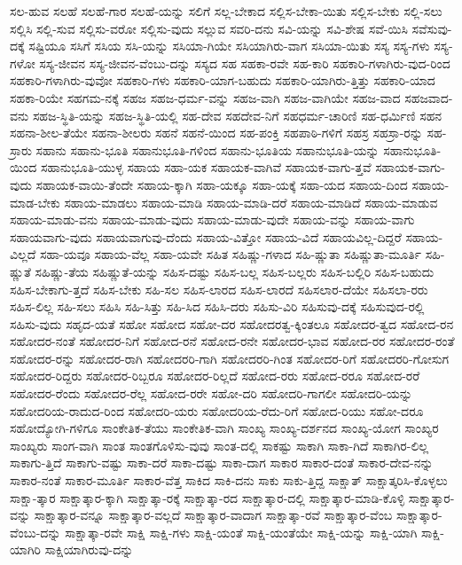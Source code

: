 {ಸಲ-ಹುವ
ಸಲಹೆ
ಸಲಹೆ-ಗಾರ
ಸಲಹೆ-ಯನ್ನು
ಸಲಿಗೆ
ಸಲ್ಲ-ಬೇಕಾದ
ಸಲ್ಲಿಸ-ಬೇಕಾ-ಯಿತು
ಸಲ್ಲಿಸ-ಬೇಕು
ಸಲ್ಲಿ-ಸಲು
ಸಲ್ಲಿಸಿ
ಸಲ್ಲಿ-ಸುವ
ಸಲ್ಲಿಸು-ವರೋ
ಸಲ್ಲಿಸು-ವುದು
ಸಲ್ಲುವ
ಸವರಿ-ದನು
ಸವಿ-ಯನ್ನು
ಸವಿ-ಶೇಷ
ಸವೆ-ಯಿಸಿ
ಸವೆಸುವು-ದಕ್ಕೆ
ಸಷ್ಟಿಯೂ
ಸಸಿಗೆ
ಸಸಿಯ
ಸಸಿ-ಯನ್ನು
ಸಸಿಯಾ-ಗಿಯೇ
ಸಸಿಯಾಗಿರು-ವಾಗ
ಸಸಿಯಾ-ಯಿತು
ಸಸ್ಯ
ಸಸ್ಯ-ಗಳು
ಸಸ್ಯ-ಗಳೋ
ಸಸ್ಯ-ಜೀವನ
ಸಸ್ಯ-ಜೀವನ-ವೆಂಬು-ದನ್ನು
ಸಸ್ಯದ
ಸಹ
ಸಹಕಾ-ರವೇ
ಸಹ-ಕಾರಿ
ಸಹಕಾರಿ-ಗಳಾಗಿರು-ವುದ-ರಿಂದ
ಸಹಕಾರಿ-ಗಳಾಗಿರು-ವುವೋ
ಸಹಕಾರಿ-ಗಳು
ಸಹಕಾರಿ-ಯಾಗ-ಬಹುದು
ಸಹಕಾರಿ-ಯಾಗಿರು-ತ್ತಿತ್ತು
ಸಹಕಾರಿ-ಯಾದ
ಸಹಕಾ-ರಿಯೇ
ಸಹಗಮ-ನಕ್ಕೆ
ಸಹಜ
ಸಹಜ-ಧರ್ಮ-ವನ್ನು
ಸಹಜ-ವಾಗಿ
ಸಹಜ-ವಾಗಿಯೇ
ಸಹಜ-ವಾದ
ಸಹಜವಾದ-ವನು
ಸಹಜ-ಸ್ಥಿತಿ-ಯನ್ನು
ಸಹಜ-ಸ್ಥಿತಿ-ಯಲ್ಲಿ
ಸಹ-ದೇವ
ಸಹದೇವ-ನಿಗೆ
ಸಹಧರ್ಮ-ಚಾರಿಣಿ
ಸಹ-ಧರ್ಮಿಣಿ
ಸಹನ
ಸಹನಾ-ಶೀಲ-ತೆಯೇ
ಸಹನಾ-ಶೀಲರು
ಸಹನೆ
ಸಹನೆ-ಯಿಂದ
ಸಹ-ಪಂಕ್ತಿ
ಸಹಪಾಠಿ-ಗಳಿಗೆ
ಸಹಸ್ರ
ಸಹಸ್ರಾ-ರನ್ನು
ಸಹ-ಸ್ರಾರು
ಸಹಾನು
ಸಹಾನು-ಭೂತಿ
ಸಹಾನುಭೂತಿ-ಗಳಿಂದ
ಸಹಾನು-ಭೂತಿಯ
ಸಹಾನುಭೂತಿ-ಯನ್ನು
ಸಹಾನುಭೂತಿ-ಯಿಂದ
ಸಹಾನುಭೂತಿ-ಯುಳ್ಳ
ಸಹಾಯ
ಸಹಾ-ಯಕ
ಸಹಾಯಕ-ವಾಗಿವೆ
ಸಹಾಯಕ-ವಾಗು-ತ್ತವೆ
ಸಹಾಯಕ-ವಾಗು-ವುದು
ಸಹಾಯಕ-ವಾಯಿ-ತೆಂದೇ
ಸಹಾಯ-ಕ್ಕಾಗಿ
ಸಹಾ-ಯಕ್ಕೂ
ಸಹಾ-ಯಕ್ಕೆ
ಸಹಾ-ಯದ
ಸಹಾಯ-ದಿಂದ
ಸಹಾಯ-ಮಾಡ-ಬೇಕು
ಸಹಾಯ-ಮಾಡಲು
ಸಹಾಯ-ಮಾಡಿ
ಸಹಾಯ-ಮಾಡಿ-ದರೆ
ಸಹಾಯ-ಮಾಡಿದೆ
ಸಹಾಯ-ಮಾಡುವ
ಸಹಾಯ-ಮಾಡು-ವನು
ಸಹಾಯ-ಮಾಡು-ವುದು
ಸಹಾಯ-ಮಾಡು-ವುದೇ
ಸಹಾಯ-ವನ್ನು
ಸಹಾಯ-ವಾಗು
ಸಹಾಯವಾಗು-ವುದು
ಸಹಾಯವಾಗುವು-ದೆಂದು
ಸಹಾಯ-ವಿತ್ತೋ
ಸಹಾಯ-ವಿದೆ
ಸಹಾಯವಿಲ್ಲ-ದಿದ್ದರೆ
ಸಹಾಯ-ವಿಲ್ಲದೆ
ಸಹಾ-ಯವೂ
ಸಹಾಯ-ವೆಲ್ಲ
ಸಹಾ-ಯವೇ
ಸಹಿತ
ಸಹಿಷ್ಣು-ಗಳಾದ
ಸಹಿ-ಷ್ಣುತಾ
ಸಹಿಷ್ಣುತಾ-ಮೂರ್ತಿ
ಸಹಿ-ಷ್ಣುತೆ
ಸಹಿಷ್ಣು-ತೆಯ
ಸಹಿಷ್ಣುತೆ-ಯನ್ನು
ಸಹಿಸ-ದಷ್ಟು
ಸಹಿಸ-ಬಲ್ಲ
ಸಹಿಸ-ಬಲ್ಲರು
ಸಹಿಸ-ಬಲ್ಲಿರಿ
ಸಹಿಸ-ಬಹುದು
ಸಹಿಸ-ಬೇಕಾಗು-ತ್ತದೆ
ಸಹಿಸ-ಬೇಕು
ಸಹಿ-ಸಲ
ಸಹಿಸ-ಲಾರದ
ಸಹಿಸ-ಲಾರದೆ
ಸಹಿಸಲಾರ-ದೆಯೇ
ಸಹಿಸಲಾ-ರರು
ಸಹಿಸ-ಲಿಲ್ಲ
ಸಹಿ-ಸಲು
ಸಹಿಸಿ
ಸಹಿ-ಸಿತ್ತು
ಸಹಿ-ಸಿದ
ಸಹಿಸಿ-ದರು
ಸಹಿಸು-ವಿರಿ
ಸಹಿಸುವು-ದಕ್ಕೆ
ಸಹಿಸುವುದ-ರಲ್ಲಿ
ಸಹಿಸು-ವುದು
ಸಹೃದ-ಯತೆ
ಸಹೋ
ಸಹೋದ
ಸಹೋ-ದರ
ಸಹೋದರತ್ವ-ಕ್ಕಿಂತಲೂ
ಸಹೋದರ-ತ್ವದ
ಸಹೋದ-ರನ
ಸಹೋದರ-ನಂತೆ
ಸಹೋದರ-ನಿಗೆ
ಸಹೋದ-ರನೆ
ಸಹೋದ-ರನೇ
ಸಹೋದರ-ಭಾವ
ಸಹೋದ-ರರ
ಸಹೋದರ-ರಂತೆ
ಸಹೋದರ-ರನ್ನು
ಸಹೋದರ-ರಾಗಿ
ಸಹೋದರರಿ-ಗಾಗಿ
ಸಹೋದರರಿ-ಗಿಂತ
ಸಹೋದರ-ರಿಗೆ
ಸಹೋದರರಿ-ಗೋಸುಗ
ಸಹೋದರ-ರಿದ್ದರು
ಸಹೋದರ-ರಿಬ್ಬರೂ
ಸಹೋದರ-ರಿಲ್ಲದೆ
ಸಹೋದ-ರರು
ಸಹೋದ-ರರೂ
ಸಹೋದ-ರರೆ
ಸಹೋದರ-ರೆಂದು
ಸಹೋದರ-ರೆಲ್ಲ
ಸಹೋದ-ರರೇ
ಸಹೋ-ದರಿ
ಸಹೋದರಿ-ಗಾಗಲೀ
ಸಹೋದರಿ-ಯನ್ನು
ಸಹೋದರಿಯ-ರಾದುದ-ರಿಂದ
ಸಹೋದರಿ-ಯರು
ಸಹೋದರಿಯ-ರೆದು-ರಿಗೆ
ಸಹೋದ-ರಿಯು
ಸಹೋ-ದರೂ
ಸಹೋದ್ಯೋಗಿ-ಗಳಿಗೂ
ಸಾಂಕೇತಿಕ-ತೆಯು
ಸಾಂಕೇತಿಕ-ವಾಗಿ
ಸಾಂಖ್ಯ
ಸಾಂಖ್ಯ-ದರ್ಶನದ
ಸಾಂಖ್ಯ-ಯೋಗ
ಸಾಂಖ್ಯರ
ಸಾಂಖ್ಯರು
ಸಾಂಗ-ವಾಗಿ
ಸಾಂತ
ಸಾಂತಗೊಳಿಸು-ವುವು
ಸಾಂತ-ದಲ್ಲಿ
ಸಾಕಷ್ಟು
ಸಾಕಾಗಿ
ಸಾಕಾ-ಗಿದೆ
ಸಾಕಾಗಿರ-ಲಿಲ್ಲ
ಸಾಕಾಗು-ತ್ತಿದೆ
ಸಾಕಾಗು-ವಷ್ಟು
ಸಾಕಾ-ದರೆ
ಸಾಕಾ-ದಷ್ಟು
ಸಾಕಾ-ದಾಗ
ಸಾಕಾರ
ಸಾಕಾರ-ದಂತೆ
ಸಾಕಾರ-ದೇವ-ನನ್ನು
ಸಾಕಾರ-ನಂತೆ
ಸಾಕಾರ-ಮೂರ್ತಿ
ಸಾಕಾರ-ವೆತ್ತ
ಸಾಕಿದ
ಸಾಕಿ-ದನು
ಸಾಕು
ಸಾಕು-ತ್ತಿದ್ದ
ಸಾಕ್ಷಾತ್
ಸಾಕ್ಷಾತ್ಕರಿಸಿ-ಕೊಳ್ಳಲು
ಸಾಕ್ಷಾ-ತ್ಕಾರ
ಸಾಕ್ಷಾತ್ಕಾರ-ಕ್ಕಾಗಿ
ಸಾಕ್ಷಾತ್ಕಾ-ರಕ್ಕೆ
ಸಾಕ್ಷಾತ್ಕಾ-ರದ
ಸಾಕ್ಷಾತ್ಕಾರ-ದಲ್ಲಿ
ಸಾಕ್ಷಾತ್ಕಾರ-ಮಾಡಿ-ಕೊಳ್ಳಿ
ಸಾಕ್ಷಾತ್ಕಾರ-ವನ್ನು
ಸಾಕ್ಷಾತ್ಕಾರ-ವನ್ನೂ
ಸಾಕ್ಷಾತ್ಕಾರ-ವಲ್ಲದೆ
ಸಾಕ್ಷಾತ್ಕಾರ-ವಾದಾಗ
ಸಾಕ್ಷಾತ್ಕಾ-ರವೆ
ಸಾಕ್ಷಾತ್ಕಾರ-ವೆಂಬ
ಸಾಕ್ಷಾತ್ಕಾರ-ವೆಂಬು-ದನ್ನು
ಸಾಕ್ಷಾತ್ಕಾ-ರವೇ
ಸಾಕ್ಷಿ
ಸಾಕ್ಷಿ-ಗಳು
ಸಾಕ್ಷಿ-ಯಂತೆ
ಸಾಕ್ಷಿ-ಯಂತೆಯೇ
ಸಾಕ್ಷಿ-ಯನ್ನು
ಸಾಕ್ಷಿ-ಯಾಗಿ
ಸಾಕ್ಷಿ-ಯಾಗಿರಿ
ಸಾಕ್ಷಿಯಾಗಿರುವು-ದನ್ನು
}
